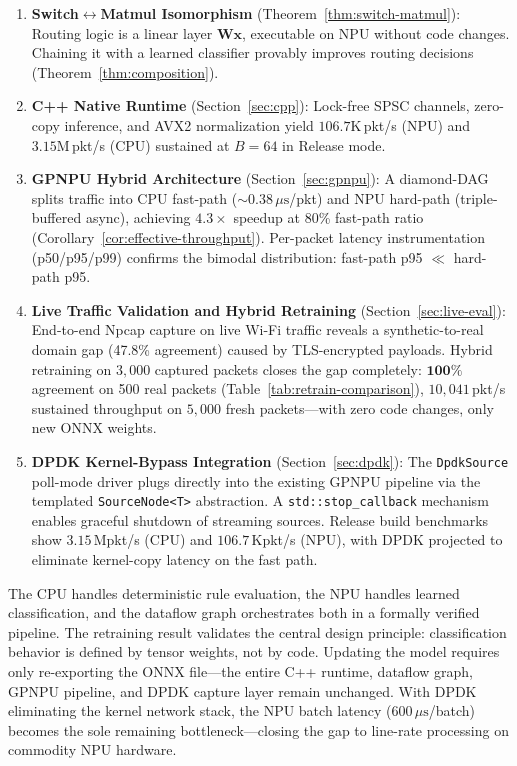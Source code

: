 \documentclass[11pt,a4paper,twoside]{article}
\theoremstyle{definition}
\theoremstyle{remark}
\newcommand{\mat}[1]{\mathbf{#1}}
\newcommand{\vect}[1]{\mathbf{#1}}
\begin{document}
\begin{enumerate}
  \item \textbf{Switch$\leftrightarrow$Matmul Isomorphism} (Theorem~\ref{thm:switch-matmul}): Routing logic is a linear layer $\mat{W}\vect{x}$, executable on NPU without code changes. Chaining it with a learned classifier provably improves routing decisions (Theorem~\ref{thm:composition}).

  \item \textbf{C++ Native Runtime} (Section~\ref{sec:cpp}): Lock-free SPSC channels, zero-copy inference, and AVX2 normalization yield $106.7\text{K}$\,pkt/s (NPU) and $3.15\text{M}$\,pkt/s (CPU) sustained at $B{=}64$ in Release mode.

  \item \textbf{GPNPU Hybrid Architecture} (Section~\ref{sec:gpnpu}): A diamond-DAG splits traffic into CPU fast-path (${\sim}0.38\,\mu\text{s}$/pkt) and NPU hard-path (triple-buffered async), achieving $4.3\times$ speedup at 80\% fast-path ratio (Corollary~\ref{cor:effective-throughput}). Per-packet latency instrumentation (p50/p95/p99) confirms the bimodal distribution: fast-path p95 $\ll$ hard-path p95.

  \item \textbf{Live Traffic Validation and Hybrid Retraining} (Section~\ref{sec:live-eval}): End-to-end Npcap capture on live Wi-Fi traffic reveals a synthetic-to-real domain gap (47.8\% agreement) caused by TLS-encrypted payloads. Hybrid retraining on $3{,}000$ captured packets closes the gap completely: $\mathbf{100\%}$ agreement on 500 real packets (Table~\ref{tab:retrain-comparison}), $10{,}041$\,pkt/s sustained throughput on $5{,}000$ fresh packets---with zero code changes, only new ONNX weights.

  \item \textbf{DPDK Kernel-Bypass Integration} (Section~\ref{sec:dpdk}): The \texttt{DpdkSource} poll-mode driver plugs directly into the existing GPNPU pipeline via the templated \texttt{SourceNode<T>} abstraction. A \texttt{std::stop\_callback} mechanism enables graceful shutdown of streaming sources. Release build benchmarks show $3.15$\,Mpkt/s (CPU) and $106.7$\,Kpkt/s (NPU), with DPDK projected to eliminate kernel-copy latency on the fast path.
\end{enumerate}

\noindent The CPU handles deterministic rule evaluation, the NPU handles learned classification, and the dataflow graph orchestrates both in a formally verified pipeline. The retraining result validates the central design principle: classification behavior is defined by tensor weights, not by code. Updating the model requires only re-exporting the ONNX file---the entire C++ runtime, dataflow graph, GPNPU pipeline, and DPDK capture layer remain unchanged. With DPDK eliminating the kernel network stack, the NPU batch latency ($600\,\mu\text{s}$/batch) becomes the sole remaining bottleneck---closing the gap to line-rate processing on commodity NPU hardware.
\end{document}
